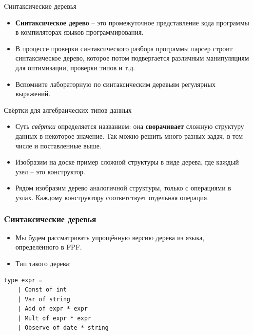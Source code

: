\documentclass{beamer}
\begin{document}
\begin{frame}{Cинтаксические деревья}
\begin{itemize}
\item
  \textbf{Синтаксическое дерево} -- это промежуточное представление кода
  программы в компиляторах языков программирования.
\item
  В процессе проверки синтаксического разбора программы парсер строит
  синтаксическое дерево, которое потом подвергается различным
  манипуляциям для оптимизации, проверки типов и т.д.
\item
  Вспомните лабораторную по синтаксическим деревьям регулярных
  выражений.
\end{itemize}
\end{frame}\begin{frame}{Свёртки для алгебраических типов данных}

\begin{itemize}
\item
  Суть \emph{свёртки} определяется названием: она \textbf{сворачивает}
  сложную структуру данных в некоторое значение. Так можно решить много
  разных задач, в том числе и поставленные выше.
\item
  Изобразим на доске пример сложной структуры в виде дерева, где каждый
  узел -- это конструктор.
\item
  Рядом изобразим дерево аналогичной структуры, только с операциями в
  узлах. Каждому конструктору соответствует отдельная операция.
\end{itemize}
\end{frame}

\begin{frame}[fragile]
\frametitle{Cинтаксические деревья}
\begin{itemize}
\item
  Мы будем рассматривать упрощённую версию дерева из языка,
  определённого в FPF.
\item
  Тип такого дерева:
\end{itemize}

\begin{lstlisting}
type expr =
    | Const of int
    | Var of string
    | Add of expr * expr
    | Mult of expr * expr
    | Observe of date * string
\end{lstlisting}

\end{frame}
\end{document}
